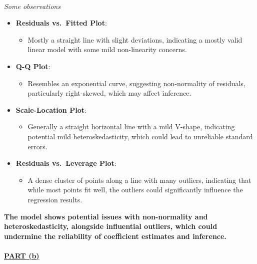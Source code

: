 \documentclass[
  11pt,
]{article}
\makeatletter
\let\oldparagraph\paragraph
\renewcommand{\paragraph}{
    \@ifstar
      \xxxParagraphStar
      \xxxParagraphNoStar
  }
\newcommand{\xxxParagraphStar}[1]{\oldparagraph*{#1}\mbox{}}
\newcommand{\xxxParagraphNoStar}[1]{\oldparagraph{#1}\mbox{}}
\providecommand{\tightlist}{%
  \setlength{\itemsep}{0pt}\setlength{\parskip}{0pt}}\usepackage{longtable,booktabs,array}
\makeatother
\begin{document}
\paragraph{\texorpdfstring{\emph{Some
observations}}{Some observations}}\label{some-observations}

\begin{itemize}
\item
  \textbf{Residuals vs.~Fitted Plot}:

  \begin{itemize}
  \tightlist
  \item
    Mostly a straight line with slight deviations, indicating a mostly
    valid linear model with some mild non-linearity concerns.
  \end{itemize}
\item
  \textbf{Q-Q Plot}:

  \begin{itemize}
  \tightlist
  \item
    Resembles an exponential curve, suggesting non-normality of
    residuals, particularly right-skewed, which may affect inference.
  \end{itemize}
\item
  \textbf{Scale-Location Plot}:

  \begin{itemize}
  \tightlist
  \item
    Generally a straight horizontal line with a mild V-shape, indicating
    potential mild heteroskedasticity, which could lead to unreliable
    standard errors.
  \end{itemize}
\item
  \textbf{Residuals vs.~Leverage Plot}:

  \begin{itemize}
  \tightlist
  \item
    A dense cluster of points along a line with many outliers,
    indicating that while most points fit well, the outliers could
    significantly influence the regression results.
  \end{itemize}
\end{itemize}

\textbf{The model shows potential issues with non-normality and
heteroskedasticity, alongside influential outliers, which could
undermine the reliability of coefficient estimates and inference.}

\paragraph{\texorpdfstring{\ul{\textbf{PART
(b)}}}{PART (b)}}\label{part-b}
\end{document}
